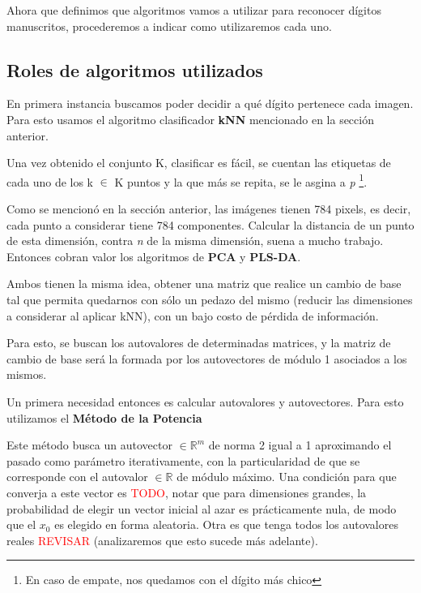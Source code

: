 Ahora que definimos que algoritmos vamos a utilizar para reconocer d\'igitos manuscritos, procederemos a indicar como utilizaremos cada uno.

\subsection{Roles de algoritmos utilizados}

En primera instancia buscamos poder decidir a qu\'e d\'igito pertenece cada imagen. Para esto usamos el algoritmo clasificador \textbf{kNN} mencionado en la secci\'on anterior.

Una vez obtenido el conjunto K, clasificar es f\'acil, se cuentan las etiquetas de cada uno de los k $\in$ K puntos y la que m\'as se repita, se le asgina a \textit{p} \footnote{En caso de empate, nos quedamos con el d\'igito m\'as chico}.

Como se mencion\'o en la secci\'on anterior, las im\'agenes tienen 784 pixels, es decir, cada punto a considerar tiene 784 componentes. Calcular la distancia de un punto de esta dimensi\'on, contra \textit{n} de la misma dimensi\'on, suena a mucho trabajo. Entonces cobran valor los algoritmos de \textbf{PCA} y \textbf{PLS-DA}.

Ambos tienen la misma idea, obtener una matriz que realice un cambio de base tal que permita quedarnos con s\'olo un pedazo del mismo (reducir las dimensiones a considerar al aplicar kNN), con un bajo costo de p\'erdida de informaci\'on.

Para esto, se buscan los autovalores de determinadas matrices, y la matriz de cambio de base ser\'a la formada por los autovectores de m\'odulo 1 asociados a los mismos.

Un primera necesidad entonces es calcular autovalores y autovectores. Para esto utilizamos el \textbf{M\'etodo de la Potencia}

\begin{algorithm}
\begin{algorithmic}[1]
\ENDWHILE
{}
\end{algorithmic}
\caption{M\'etodo de la Potencia($B, x_{0}$, condici\'on de finalizaci\'on)}
\end{algorithm}

Este m\'etodo busca un autovector $\in \mathbb{R}^{m}$ de norma 2 igual a 1 aproximando el pasado como par\'ametro iterativamente, con la particularidad de que se corresponde con el autovalor $\in \mathbb{R}$ de m\'odulo m\'aximo. Una condici\'on para que converja a este vector es \textcolor{red}{TODO}, notar que para dimensiones grandes, la probabilidad de elegir un vector inicial al azar es pr\'acticamente nula, de modo que el $x_{0}$ es elegido en forma aleatoria. Otra es que tenga todos los autovalores reales \textcolor{red}{REVISAR} (analizaremos que esto sucede m\'as adelante).

